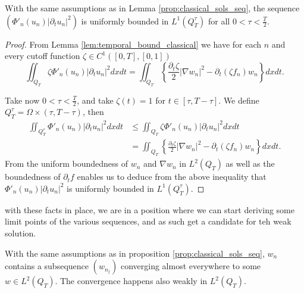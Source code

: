 \documentclass[11pt, a4paper]{article}
\begin{document}
\begin{lemma}
\label{prop:temporal_bound}
With the same assumptions as in Lemma \ref{prop:classical_sols_seq}, the sequence $(\Phi'_n(u_n) |\partial_t u_n|^2)$ is uniformly bounded in $L^1(Q_T^\tau)$ for all $0 < \tau < \frac{T}{2}$.
\end{lemma}

\begin{proof}
From Lemma \ref{lem:temporal_bound_classical} we have for each $n$ and every cutoff function $\zeta\in C^1([0,T], [0,1])$
	\begin{equation}
	\iint_{Q_T} \zeta \Phi'_n(u_n) |\partial_t u_n|^2 dxdt = \iint_{Q_T} \left\{ \frac{\partial_t \zeta}{2}|\nabla w_n|^2 - \partial_t(\zeta f_n) w_n \right\} dxdt.
	\end{equation}
	
	Take now $0<\tau < \frac{T}{2}$, and take $\zeta(t)=1$ for $t\in [\tau, T-\tau]$. We define $Q_T^\tau = \Omega \times (\tau, T - \tau)$, then
	\begin{align*}
	\iint_{Q_T^\tau}\Phi'_n(u_n)|\partial_t u_n|^2 dxdt & \leq \iint_{Q_T}\zeta\Phi'_n(u_n)|\partial_t u_n|^2 dxdt \\
	&= \iint_{Q_T} \left\{ \frac{\partial_t \zeta}{2}|\nabla w_n|^2 - \partial_t(\zeta f_n) w_n \right\} dxdt.
	\end{align*}
	From the uniform boundedness of $w_n$ and $\nabla w_n$ in $L^2(Q_T)$ as well as the boundedness of $\partial_t f$ enables us to deduce from the above inequality that $\Phi'_n(u_n)|\partial_t u_n|^2$ is uniformly bounded in $L^1(Q_T^\tau)$.
\end{proof}

with these facts in place, we are in a position where we can start deriving some limit points of the various sequences, and as such get a candidate for teh weak solution.

\begin{lemma}
\label{prop:weak_convergence_w_n}
With the same assumptions as in proposition \ref{prop:classical_sols_seq},
$w_n$ contains a subsequence $(w_{n_j})$ converging almost everywhere to some $w \in L^2(Q_T)$. The convergence happens also weakly in $L^2(Q_T)$.
\end{lemma}
\end{document}

